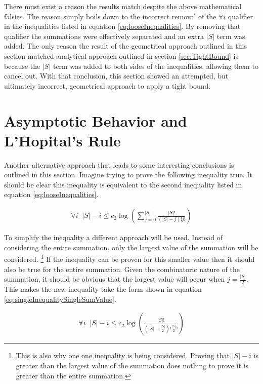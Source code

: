 \documentclass{article}
\begin{document}
There must exist a reason the results match despite the above mathematical falsies. The reason simply boils down to the incorrect removal of the $\forall i$ qualifier in the inequalities listed in equation \ref{eq:looseInequalities}. By removing that qualifier the summations were effectively separated and an extra $|S|$ term was added. The only reason the result of the geometrical approach outlined in this section matched analytical approach outlined in section \ref{sec:TightBound} is because the $|S|$ term was added to both sides of the inequalities, allowing them to cancel out. With that conclusion, this section showed an attempted, but ultimately incorrect, geometrical approach to apply a tight bound.


\section{Asymptotic Behavior and L'Hopital's Rule}
\label{sec:LHopitalsRule}

Another alternative approach that leads to some interesting conclusions is outlined in this section. Imagine trying to prove the following inequality true. It should be clear this inequality is equivalent to the second inequality listed in equation \ref{eq:looseInequalities}.

\begin{equation}
	\begin{split}
		\forall i \;\; |S|-i\le c_2 \log \left( \sum_{j=0}^{|S|}\frac{|S|!}{(|S|-j)!j!} \right)
	\end{split}
	\label{eq:singleInequality}
\end{equation}

To simplify the inequality a different approach will be used. Instead of considering the entire summation, only the largest value of the summation will be considered. \footnote{This is also why one one inequality is being considered. Proving that $|S|-i$ is greater than the largest value of the summation does nothing to prove it is greater than the entire summation.} If the inequality can be proven for this smaller value then it should also be true for the entire summation. Given the combinatoric nature of the summation, it should be obvious that the largest value will occur when $j=\frac{|S|}{2}$. This makes the new inequality take the form shown in equation \ref{eq:singleInequalitySingleSumValue}.

\begin{equation}
	\begin{split}
		\forall i \;\; |S|-i\le c_2 \log \left( \frac{|S|!}{(|S|-\frac{|S|}{2})!\frac{|S|}{2}!} \right)
	\end{split}
	\label{eq:singleInequalitySingleSumValue}
\end{equation}
\end{document}
